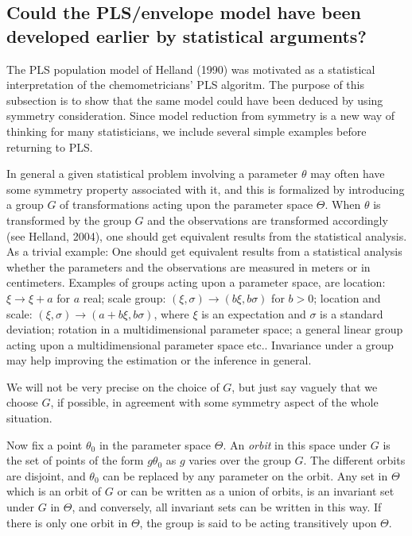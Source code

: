 \documentclass[11pt]{article}
\begin{document}
\subsection{Could the PLS/envelope model have been developed earlier by statistical arguments?}

The PLS population model of Helland (1990) was motivated as a statistical interpretation of the chemometricians' PLS algoritm. The purpose of this subsection is to show that the same model could have been deduced by using symmetry consideration. Since model reduction from symmetry is a new way of thinking for many statisticians, we include several simple examples before returning to PLS.

In general a given statistical problem involving a parameter $\theta$ may often have some 
symmetry property associated with it, and this is formalized by introducing a group $G$ of transformations acting upon the parameter space $\Theta$. 
When $\theta$ is transformed by the group $G$ and the observations are transformed accordingly (see Helland, 2004), one should get equivalent results from the 
statistical analysis. As a trivial example: One should get equivalent results from a statistical analysis whether the parameters and the observations are measured 
in meters or in centimeters. Examples of groups acting upon a parameter space, are location: 
$\xi\rightarrow \xi+a$ for $a$ real; scale group: $(\xi ,\sigma)\rightarrow (b\xi , b\sigma)$ for $b>0$; location and scale: 
$(\xi,\sigma)\rightarrow(a+b\xi, b\sigma)$, where $\xi$ is an expectation and $\sigma$ is a standard deviation; rotation in a multidimensional 
parameter space; a general linear group acting upon a multidimensional parameter space etc.. Invariance under a group may help improving the estimation or the inference in general.


We will not be very precise on the choice of $G$, but just say vaguely that we choose $G$, if possible, in agreement with some symmetry aspect of the whole situation.

Now fix a point $\theta_0$ in the parameter space $\Theta$. An \emph{orbit} in this space under $G$ is the set of points of the form $g\theta_0 $ as $g$ varies over the group $G$. The different orbits are disjoint, and $\theta_0$ 
can be replaced by any parameter on the orbit. Any set in $\Theta$ which is an orbit of $G$ or can be written as a union of orbits, is an invariant set under $G$ in $\Theta$, and conversely, all invariant sets can be written in 
this way. If there is only one orbit in $\Theta$, the group is said to be acting transitively upon $\Theta$.
\end{document}
